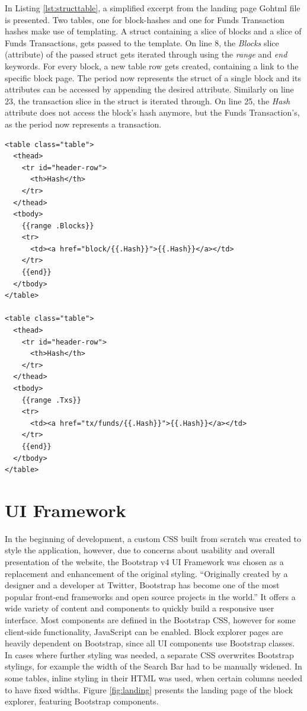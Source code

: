 In Listing \ref{lst:structtable}, a simplified excerpt from the landing page Gohtml file is presented. Two tables, one for block-hashes and one for Funds Transaction hashes make use of templating. A struct containing a slice of blocks and a slice of Funds Transactions, gets passed to the template. On line 8, the \emph{Blocks} slice (attribute) of the passed struct gets iterated through using the \emph{range} and \emph{end} keywords. For every block, a new table row gets created, containing a link to the specific block page. The period now represents the struct of a single block and its attributes can be accessed by appending the desired attribute. Similarly on line 23, the transaction slice in the struct is iterated through. On line 25, the \emph{Hash} attribute does not access the block's hash anymore, but the Funds Transaction's, as the period now represents a transaction.
\newpage
\begin{lstlisting}[caption={Block and Funds Transaction Tables Accessing a \emph{blocksandtx} Struct},captionpos=b,label={lst:structtable}]
<table class="table">
  <thead>
    <tr id="header-row">
      <th>Hash</th>
    </tr>
  </thead>
  <tbody>
    {{range .Blocks}}
    <tr>
      <td><a href="block/{{.Hash}}">{{.Hash}}</a></td>
    </tr>
    {{end}}
  </tbody>
</table>

<table class="table">
  <thead>
    <tr id="header-row">
      <th>Hash</th>
    </tr>
  </thead>
  <tbody>
    {{range .Txs}}
    <tr>
      <td><a href="tx/funds/{{.Hash}}">{{.Hash}}</a></td>
    </tr>
    {{end}}
  </tbody>
</table>
\end{lstlisting}

\section{UI Framework} \label{sec:uiframeworks}
In the beginning of development, a custom CSS built from scratch was created to style the application, however, due to concerns about usability and overall presentation of the website, the Bootstrap v4 UI Framework \cite{bootstrap} was chosen as a replacement and enhancement of the original styling.
``Originally created by a designer and a developer at Twitter, Bootstrap has become one of the most popular front-end frameworks and open source projects in the world.'' \cite{bootstraphistory}
It offers a wide variety of content and components to quickly build a responsive user interface. Most components are defined in the Bootstrap CSS, however for some client-side functionality, JavaScript can be enabled. Block explorer pages are heavily dependent on Bootstrap, since all UI components use Bootstrap classes. In cases where further styling was needed, a separate CSS overwrites Bootstrap stylings, for example the width of the Search Bar had to be manually widened. In some tables, inline styling in their HTML was used, when certain columns needed to have fixed widths. Figure \ref{fig:landing} presents the landing page of the block explorer, featuring Bootstrap components.

